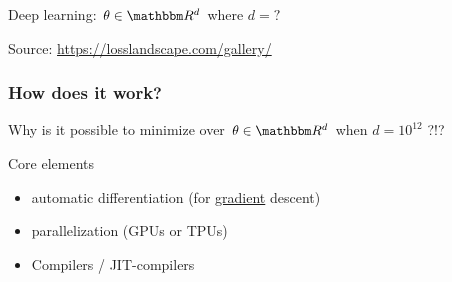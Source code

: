 \documentclass[
    xcolor={svgnames,dvipsnames},
    hyperref={colorlinks, citecolor=DeepPink4, linkcolor=DarkRed, urlcolor=DarkBlue}
    ]{beamer}  %
\newcommand{\1}{\mathbbm 1}
\newcommand{\RR}{\mathbbm R}
\begin{document}
\begin{frame}

    Deep learning: $\theta \in \RR^d$ where $d = ?$
    
    \begin{figure}
       \begin{center}
       \end{center}
    \end{figure}

    Source: \url{https://losslandscape.com/gallery/}

\end{frame}




\begin{frame}
    \frametitle{How does it work?}
    
    Why is it possible to minimize over $\theta \in \RR^d$ when $d=10^{12}$ ?!?

        \vspace{0.5em}
        \vspace{0.5em}
        \vspace{0.5em}
        \vspace{0.5em}
        \pause

    Core elements
    \begin{itemize}
        \item automatic differentiation (for \underline{gradient} descent)
        \vspace{0.5em}
        \item parallelization (GPUs or TPUs)
        \vspace{0.5em}
        \item Compilers / JIT-compilers
    \end{itemize}

\end{frame}
\end{document}
